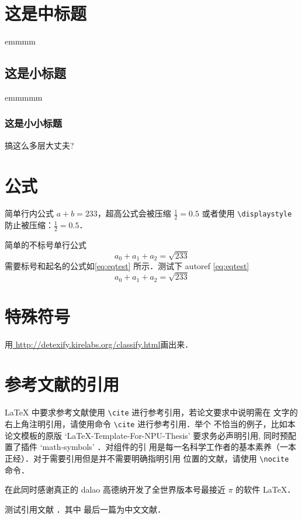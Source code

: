 \documentclass[lang=chs, degree=phd, blindreview=false, adobe=true]{yanputhesis}
\begin{document}
\section{这是中标题}
emmmm
\subsection{这是小标题}
emmmmm
\subsubsection{这是小小标题}
搞这么多层大丈夫?

\section{公式}
简单行内公式 $a+b=233$，超高公式会被压缩 $\frac{1}{2}=0.5$ 或者使用
\lstinline`\displaystyle` 防止被压缩：$\displaystyle \frac{1}{2}=0.5$．

简单的不标号单行公式
$$a_0+a_1+a_2=\sqrt{233}$$
需要标号和起名的公式如\autoref{eq:eqtest} 所示．测试下 autoref \autoref{eq:eqtest}
\begin{equation}
    \label{eq:eqtest}
    a_0 + a_1 + a_2 = \sqrt{233}
\end{equation}

\section{特殊符号}

用\href{http://detexify.kirelabs.org/classify.html}{
    http://detexify.kirelabs.org/classify.html}画出来．

\section{参考文献的引用}

\LaTeX{} 中要求参考文献使用 \lstinline`\cite` 进行参考引用，若论文要求中说明需在
文字的右上角注明引用，请使用命令 \lstinline`\cite` 进行参考引用．举个
不恰当的例子，比如本论文模板的原版
`LaTeX-Template-For-NPU-Thesis'\cite{NWPUThesisLaTeXTemplate} 要求务必声明引用,
同时预配置了插件 `math-symbols' \cite{MathSymbolsinLaTeXbypolossk}．对组件的引
用是每一名科学工作者的基本素养（一本正经）．对于需要引用但是并不需要明确指明引用
位置的文献，请使用 \lstinline`\nocite` 命令．

在此同时感谢真正的 dalao 高德纳开发了全世界版本号最接近 $\pi$ 的软件
\LaTeX \cite{knuth1986the}\nocite{lamport1989latex}．

测试引用文献 \cite{szegedy2015going, shen2021peridynamic, chen2014maiyuan}．其中
最后一篇为中文文献．
\end{document}
